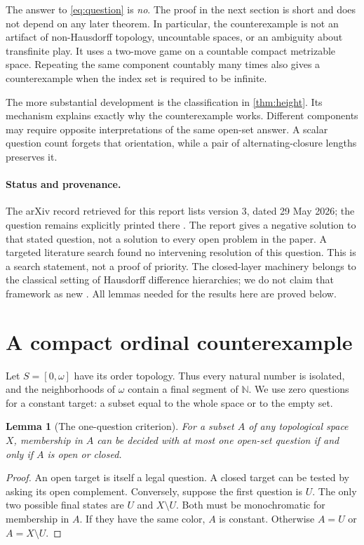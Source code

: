 \documentclass[11pt,letterpaper]{article}
\numberwithin{equation}{section}
\newtheorem{lemma}[lemma]{Lemma}
\theoremstyle{definition}
\theoremstyle{remark}
\newcommand{\N}{\mathbb N}
\begin{document}
The answer to \eqref{eq:question} is \emph{no}. The proof in the next section is
short and does not depend on any later theorem. In particular, the counterexample
is not an artifact of non-Hausdorff topology, uncountable spaces, or an ambiguity
about transfinite play. It uses a two-move game on a countable compact metrizable
space. Repeating the same component countably many times also gives a
counterexample when the index set is required to be infinite.

The more substantial development is the classification in
\cref{thm:height}. Its mechanism explains exactly why the counterexample works.
Different components may require opposite interpretations of the same
open-set answer. A scalar question count forgets that orientation, while a pair
of alternating-closure lengths preserves it.

\paragraph{Status and provenance.}
The arXiv record retrieved for this report lists version 3, dated 29 May 2026;
the question remains explicitly printed there \cite{CCS}. The report gives a
negative solution to that stated question, not a solution to every open problem
in the paper. A targeted literature search found no intervening resolution of
this question. This is a search statement, not a proof of priority. The
closed-layer machinery belongs to the classical setting of Hausdorff difference
hierarchies; we do not claim that framework as new \cite{BGKS}. All lemmas needed
for the results here are proved below.

\section{A compact ordinal counterexample}\label{sec:small}

Let $S=[0,\omega]$ have its order topology. Thus every natural number is isolated,
and the neighborhoods of $\omega$ contain a final segment of $\N$.
We use zero questions for a constant target: a subset equal to the whole space
or to the empty set.

\begin{lemma}[The one-question criterion]\label{lem:one}
For a subset $A$ of any topological space $X$, membership in $A$ can be decided
with at most one open-set question if and only if $A$ is open or closed.
\end{lemma}
\begin{proof}
An open target is itself a legal question. A closed target can be tested by
asking its open complement. Conversely, suppose the first question is $U$.
The only two possible final states are $U$ and $X\setminus U$. Both must be
monochromatic for membership in $A$. If they have the same color, $A$ is
constant. Otherwise $A=U$ or $A=X\setminus U$.
\end{proof}
\end{document}
